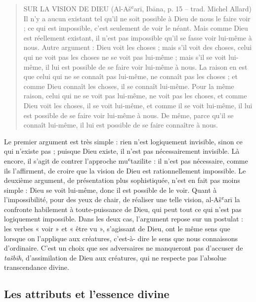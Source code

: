 \begin{quote}
    SUR LA VISION DE DIEU (Al-Ašʿarī, Ibāna, p. 15 – trad. Michel Allard)
Il n’y a aucun existant tel qu’il ne soit possible à Dieu de nous le faire voir ; ce qui est impossible, c’est seulement de voir le néant. Mais comme Dieu est réellement existant, il n’est pas impossible qu’il se fasse voir lui-même à nous.
Autre argument : Dieu voit les choses ; mais s’il voit des choses, celui qui ne voit pas les choses ne se voit pas lui-même ; mais s’il se voit lui-même, il lui est possible de se faire voir lui-même à nous. La raison en est que celui qui ne se connaît pas lui-même, ne connaît pas les choses ; et comme Dieu connaît les choses, il se connaît lui-même. Pour la même raison, celui qui ne se voit pas lui-même, ne voit pas les choses, et comme Dieu voit les choses, il se voit lui-même, et comme il se voit lui-même, il lui est possible de se faire voir lui-même à nous. De même, parce qu’il se connaît lui-même, il lui est possible de se faire connaître à nous.

\end{quote}

Le premier argument est très simple : rien n'est logiquement invisible,
sinon ce qui n'existe pas ; puisque Dieu existe, il n'est pas
nécessairement invisible. Là encore, il s'agit de contrer l'approche
muʿtazilite : il n'est pas nécessaire, comme ils l'affirment, de croire
que la vision de Dieu est rationnellement impossible. Le deuxième
argument, de présentation plus sophistiquée, n'est en fait pas moins
simple : Dieu se voit lui-même, donc il est possible de le voir. Quant à
l'impossibilité, pour des yeux de chair, de réaliser une telle vision,
al-Ašʿarī la confronte habilement à toute-puissance de Dieu, qui peut
tout ce qui n'est pas logiquement impossible. Dans les deux cas,
l'argument repose sur un postulat : les verbes « voir » et « être vu »,
s'agissant de Dieu, ont le même sens que lorsque on l'applique aux
créatures, c'est-à- dire le sens que nous connaissons d'ordinaire. C'est
un choix que ses adversaires ne manqueront pas d'accuser de
\emph{tašbīh}, d'assimilation de Dieu aux créatures, qui ne respecte pas
l'absolue transcendance divine.


  \subsection{Les attributs et l'essence divine}
  


